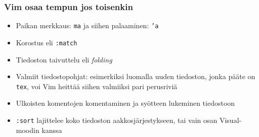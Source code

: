 \documentclass[]{beamer}
\newcommand{\Tohj}[1]{\texttt{#1}}
\newcommand{\com}[1]{{\color{blue!50!black}\Tohj{#1}} \!\!}
\begin{document}
\begin{frame}
    \frametitle{Vim osaa tempun jos toisenkin}
    \begin{itemize}
        \item Paikan merkkaus: \com{m{\color{red}a}} ja siihen palaaminen: \com{'{\color{red}a}}
        \pause
        \item Korostus eli \com{:match}
        \pause
        \item Tiedoston taivuttelu eli \emph{folding}
        \pause
        \item Valmiit tiedostopohjat: esimerkiksi luomalla uuden tiedoston, jonka pääte on \texttt{tex}, voi Vim heittää siihen valmiiksi pari perusriviä
        \pause
        \item Ulkoisten komentojen komentaminen ja syötteen lukeminen tiedostoon
        \pause
        \item \com{:sort} lajittelee koko tiedoston aakkosjärjestykseen, tai vain osan Visual-moodin kanssa
    \end{itemize}
\end{frame}

\end{document}
